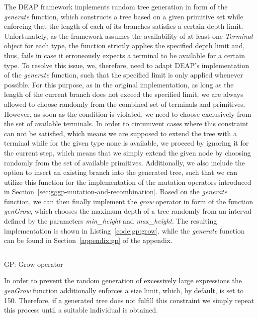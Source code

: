 The DEAP framework implements random tree generation in form of the \emph{generate} function, which constructs a tree based on a given primitive set while enforcing that the length of each of its branches satisfies a certain depth limit.
Unfortunately, as the framework assumes the availability of at least one \emph{Terminal} object for each type, the function strictly applies the specified depth limit and, thus, fails in case it erroneously expects a terminal to be available for a certain type.
To resolve this issue, we, therefore, need to adapt DEAP's implementation of the \emph{generate} function, such that the specified limit is only applied whenever possible.
For this purpose, as in the original implementation, as long as the length of the current branch does not exceed the specified limit, we are always allowed to choose randomly from the combined set of terminals and primitives.
However, as soon as the condition is violated, we need to choose exclusively from the set of available terminals. 
In order to circumvent cases where this constraint can not be satisfied, which means we are supposed to extend the tree with a terminal while for the given type none is available, we proceed by ignoring it for the current step, which means that we simply extend the given node by choosing randomly from the set of available primitives.
Additionally, we also include the option to insert an existing branch into the generated tree, such that we can utilize this function for the implementation of the mutation operators introduced in Section~\ref{sec:gggp-mutation-and-recombination}.
Based on the \emph{generate} function, we can then finally implement the \emph{grow} operator in form of the function \emph{genGrow}, which chooses the maximum depth of a tree randomly from an interval defined by the parameters \emph{min\_height} and \emph{max\_height}.
The resulting implementation is shown in Listing~\ref{code:gp:grow}, while the \emph{generate} function can be found in Section~\ref{appendix:gp} of the appendix.
\begin{listing}[!htb]
	\inputminted{python}{evostencils/gp/grow.py}
	\caption{GP: Grow operator}
	\label{code:gp:grow}
\end{listing}
In order to prevent the random generation of excessively large expressions the \emph{genGrow} function additionally enforces a size limit, which, by default, is set to 150.
Therefore, if a generated tree does not fulfill this constraint we simply repeat this process until a suitable individual is obtained.

